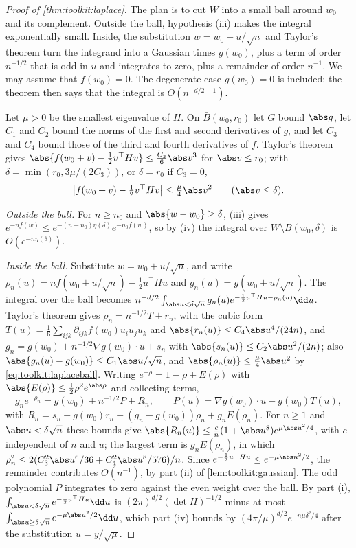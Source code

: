 \begin{refsection}
\begin{proof}[Proof of \cref{thm:toolkit:laplace}]
The plan is to cut $W$ into a small ball around $w_0$ and its complement. Outside the ball, hypothesis (iii) makes the integral exponentially small. Inside, the substitution $w=w_0+u/\sqrt n$ and Taylor's theorem turn the integrand into a Gaussian times $g(w_0)$, plus a term of order $n^{-1/2}$ that is odd in $u$ and integrates to zero, plus a remainder of order $n^{-1}$. We may assume that $f(w_0)=0$. The degenerate case $g(w_0)=0$ is included; the theorem then says that the integral is $O(n^{-d/2-1})$.

Let $\mu>0$ be the smallest eigenvalue of $H$. On $\bar B(w_0,r_0)$ let $G$ bound $\abs g$, let $C_1$ and $C_2$ bound the norms of the first and second derivatives of $g$, and let $C_3$ and $C_4$ bound those of the third and fourth derivatives of $f$. Taylor's theorem gives $\abs{f(w_0+v)-\frac12v^\top Hv}\le\frac{C_3}6\abs v^3$ for $\abs v\le r_0$; with $\delta=\min(r_0,3\mu/(2C_3))$, or $\delta=r_0$ if $C_3=0$,
\begin{equation}\label{eq:toolkit:laplaceball}
\bigl\lvert f(w_0+v)-\tfrac12v^\top Hv\bigr\rvert\le\tfrac\mu4\abs v^2\qquad(\abs v\le\delta).
\end{equation}

\emph{Outside the ball.} For $n\ge n_0$ and $\abs{w-w_0}\ge\delta$, (iii) gives $e^{-nf(w)}\le e^{-(n-n_0)\eta(\delta)}e^{-n_0f(w)}$, so by (iv) the integral over $W\setminus B(w_0,\delta)$ is $O(e^{-n\eta(\delta)})$.

\emph{Inside the ball.} Substitute $w=w_0+u/\sqrt n$, and write $\rho_n(u)=nf(w_0+u/\sqrt n)-\frac12u^\top Hu$ and $g_n(u)=g(w_0+u/\sqrt n)$. The integral over the ball becomes $n^{-d/2}\int_{\abs u<\delta\sqrt n}g_n(u)e^{-\frac12u^\top Hu-\rho_n(u)}\dd u$. Taylor's theorem gives $\rho_n=n^{-1/2}T+r_n$, with the cubic form $T(u)=\frac16\sum_{ijk}\partial_{ijk}f(w_0)u_iu_ju_k$ and $\abs{r_n(u)}\le C_4\abs u^4/(24n)$, and $g_n=g(w_0)+n^{-1/2}\nabla g(w_0)\cdot u+s_n$ with $\abs{s_n(u)}\le C_2\abs u^2/(2n)$; also $\abs{g_n(u)-g(w_0)}\le C_1\abs u/\sqrt n$, and $\abs{\rho_n(u)}\le\frac\mu4\abs u^2$ by \eqref{eq:toolkit:laplaceball}. Writing $e^{-\rho}=1-\rho+E(\rho)$ with $\abs{E(\rho)}\le\frac12\rho^2e^{\abs\rho}$ and collecting terms,
\[
g_ne^{-\rho_n}=g(w_0)+n^{-1/2}P+R_n,\qquad P(u)=\nabla g(w_0)\cdot u-g(w_0)T(u),
\]
with $R_n=s_n-g(w_0)r_n-(g_n-g(w_0))\rho_n+g_nE(\rho_n)$. For $n\ge1$ and $\abs u<\delta\sqrt n$ these bounds give $\abs{R_n(u)}\le\frac cn(1+\abs u^8)e^{\mu\abs u^2/4}$, with $c$ independent of $n$ and $u$; the largest term is $g_nE(\rho_n)$, in which $\rho_n^2\le2(C_3^2\abs u^6/36+C_4^2\abs u^8/576)/n$. Since $e^{-\frac12u^\top Hu}\le e^{-\mu\abs u^2/2}$, the remainder contributes $O(n^{-1})$, by part (ii) of \cref{lem:toolkit:gaussian}. The odd polynomial $P$ integrates to zero against the even weight over the ball. By part (i), $\int_{\abs u<\delta\sqrt n}e^{-\frac12u^\top Hu}\dd u$ is $(2\pi)^{d/2}(\det H)^{-1/2}$ minus at most $\int_{\abs u\ge\delta\sqrt n}e^{-\mu\abs u^2/2}\dd u$, which part (iv) bounds by $(4\pi/\mu)^{d/2}e^{-n\mu\delta^2/4}$ after the substitution $u=y/\sqrt\mu$.


\end{proof}
\end{refsection}
